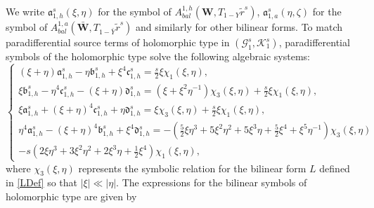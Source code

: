 \documentclass[10pt]{amsart}
\theoremstyle{remark}
\theoremstyle{definition}
\numberwithin{equation}{section}
\newcommand{\f}{\frac}
\newcommand{\bw}{\mathbf{W}}
\begin{document}
We write $\mathfrak{a}^s_{1, h}(\xi, \eta)$ for the symbol of $A^{1,h}_{bal}(\bw, T_{1-Y}\tilde{r}^s)$, $\mathfrak{a}^s_{1,a}(\eta, \zeta)$ for the symbol of $A^{1,a}_{bal}(\bar{\bw}, T_{1-\bar{Y}}\tilde{r}^s)$ and similarly for other bilinear forms.
To match  paradifferential source terms of holomorphic type in $(\mathcal{G}_1^s, \mathcal{K}_1^s)$, paradifferential symbols of the holomorphic type solve the following algebraic systems:
\begin{equation*}
\begin{cases}
(\xi + \eta)\mathfrak{a}^s_{1, h}-\eta\mathfrak{b}^s_{1, h}+\xi^4\mathfrak{c}^s_{1, h}= \f{s}{2}\xi \chi_1(\xi,\eta),\\
\xi\mathfrak{b}^s_{1, h}-\eta^4\mathfrak{c}^s_{1, h}-(\xi+\eta)\mathfrak{d}^s_{1, h}= (\xi+\xi^2\eta^{-1})\chi_{3}(\xi,\eta)+\f{s}{2}\xi\chi_1(\xi,\eta),\\
\xi\mathfrak{a}^s_{1, h}+(\xi+\eta)^4\mathfrak{c}^s_{1, h}+\eta\mathfrak{d}^s_{1, h}=\xi\chi_{3}(\xi,\eta) + \f{s}{2}\xi\chi_1(\xi,\eta),\\
\eta^4 \mathfrak{a}^s_{1, h}-(\xi+\eta)^4\mathfrak{b}^s_{1, h}+\xi^4\mathfrak{d}^s_{1, h}=-\left(\f52 \xi\eta^3+5\xi^2 \eta^2+5\xi^3\eta+\f52\xi^4+\xi^5\eta^{-1}\right)\chi_{3}(\xi,\eta) \\
-s(2\xi \eta^3 + 3\xi^2\eta^2 + 2\xi^3\eta + \f12\xi^4)\chi_1(\xi,\eta),
\end{cases}
\end{equation*}
where $\chi_3(\xi, \eta)$ represents the symbolic relation for the bilinear form $L$ defined in \eqref{LDef} so that $|\xi| \ll |\eta|$.
The expressions for the bilinear symbols of holomorphic type are given by
\end{document}
